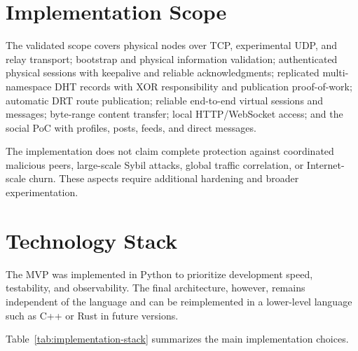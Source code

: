 \documentclass[
  12pt,
  oneside,
  a4paper,
  chapter=TITLE,
  section=TITLE,
  english,
  brazil
]{abntex2}
\begin{document}
\section{Implementation Scope}
\label{sec:implementation-scope}

The validated scope covers physical nodes over TCP, experimental UDP, and relay transport; bootstrap and physical information validation; authenticated physical sessions with keepalive and reliable acknowledgments; replicated multi-namespace DHT records with XOR responsibility and publication proof-of-work; automatic DRT route publication; reliable end-to-end virtual sessions and messages; byte-range content transfer; local HTTP/WebSocket access; and the social PoC with profiles, posts, feeds, and direct messages.

The implementation does not claim complete protection against coordinated malicious peers, large-scale Sybil attacks, global traffic correlation, or Internet-scale churn. These aspects require additional hardening and broader experimentation.

\section{Technology Stack}
\label{sec:technology-stack}

The MVP was implemented in Python to prioritize development speed, testability, and observability. The final architecture, however, remains independent of the language and can be reimplemented in a lower-level language such as C++ or Rust in future versions.

Table~\ref{tab:implementation-stack} summarizes the main implementation choices.
\end{document}
